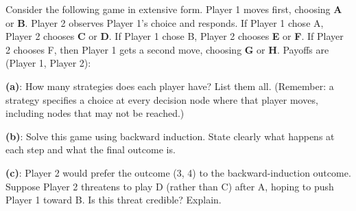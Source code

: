 \documentclass[
  english,
  11pt,
]{article}
\begin{document}
Consider the following game in extensive form. Player 1 moves first,
choosing \textbf{A} or \textbf{B}. Player 2 observes Player 1's choice
and responds. If Player 1 chose A, Player 2 chooses \textbf{C} or
\textbf{D}. If Player 1 chose B, Player 2 chooses \textbf{E} or
\textbf{F}. If Player 2 chooses F, then Player 1 gets a second move,
choosing \textbf{G} or \textbf{H}. Payoffs are (Player 1, Player 2):

\begin{center}
\end{center}

\textbf{(a)}: How many strategies does each player have? List them all.
(Remember: a strategy specifies a choice at every decision node where
that player moves, including nodes that may not be reached.)

\vspace{5cm}

\textbf{(b)}: Solve this game using backward induction. State clearly
what happens at each step and what the final outcome is.

\vspace{5cm}

\textbf{(c)}: Player 2 would prefer the outcome (3, 4) to the
backward-induction outcome. Suppose Player 2 threatens to play D (rather
than C) after A, hoping to push Player 1 toward B. Is this threat
credible? Explain.
\end{document}

